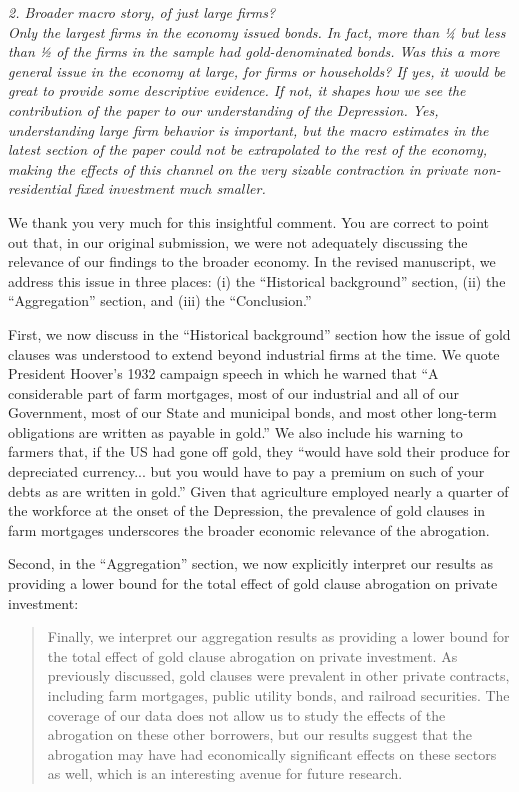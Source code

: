 \noindent \textit{\textcolor{red!60!black}{
2. Broader macro story, of just large firms?\\ 
Only the largest firms in the economy issued bonds. In fact, more than ¼ but less than ½ of the firms in the sample had gold-denominated bonds. Was this a more general issue in the economy at large, for firms or households? If yes, it would be great to provide some descriptive evidence. If not, it shapes how we see the contribution of the paper to our understanding of the Depression. Yes, understanding large firm behavior is important, but the macro estimates in the latest section of the paper could not be extrapolated to the rest of the economy, making the effects of this channel on the very sizable contraction in private non-residential fixed investment much smaller.
}}

\bigskip

\noindent We thank you very much for this insightful comment. You are correct to point out that, in our original submission, we were not adequately discussing the relevance of our findings to the broader economy. In the revised manuscript, we address this issue in three places: (i) the ``Historical background'' section, (ii) the ``Aggregation'' section, and (iii) the ``Conclusion.''

First, we now discuss in the ``Historical background'' section how the issue of gold clauses was understood to extend beyond industrial firms at the time. We quote President Hoover's 1932 campaign speech in which he warned that ``A considerable part of farm mortgages, most of our industrial and all of our Government, most of our State and municipal bonds, and most other long-term obligations are written as payable in gold.'' We also include his warning to farmers that, if the US had gone off gold, they ``would have sold their produce for depreciated currency... but you would have to pay a premium on such of your debts as are written in gold.'' Given that agriculture employed nearly a quarter of the workforce at the onset of the Depression, the prevalence of gold clauses in farm mortgages underscores the broader economic relevance of the abrogation.

Second, in the ``Aggregation'' section, we now explicitly interpret our results as providing a lower bound for the total effect of gold clause abrogation on private investment:
\begin{quotation}
Finally, we interpret our aggregation results as providing a lower bound for the total effect of gold clause abrogation on private investment. As previously discussed, gold clauses were prevalent in other private contracts, including farm mortgages, public utility bonds, and railroad securities. The coverage of our data does not allow us to study the effects of the abrogation on these other borrowers, but our results suggest that the abrogation may have had economically significant effects on these sectors as well, which is an interesting avenue for future research.
\end{quotation}

